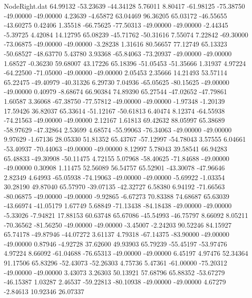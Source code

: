\begin{filecontents}{NodeRight.dat}
  64.99132  -53.23639  -44.34128     5.76011    8.80417  -61.98125  -75.38750  -49.00000  -49.00000    4.23639   -4.65872   63.04469   96.36205
  65.03172  -46.55655  -43.60275     0.42406    1.35518  -66.75625  -77.50313  -49.00000  -49.00000   -2.44345   -5.39725    4.42084   14.12795
  65.08239  -45.71762  -50.31616     7.55074    7.22842  -69.30000  -73.06875  -49.00000  -49.00000   -3.28238    1.31616   80.56657   77.12749
  65.13323  -50.68527  -48.63770     5.43780    3.93368  -65.84063  -73.20937  -49.00000  -49.00000    1.68527   -0.36230   59.68007   43.17226
  65.18396  -51.05453  -51.35666     1.31937    4.97224  -64.22500  -71.05000  -49.00000  -49.00000    2.05453    2.35666   14.21493   53.57114
  65.22475  -49.40979  -40.31326     6.29730    7.04936  -65.05625  -80.15625  -49.00000  -49.00000    0.40979   -8.68674   66.90384   74.89390
  65.27544  -47.02652  -47.79861     1.60587    3.36068  -67.38750  -77.57812  -49.00000  -49.00000   -1.97348   -1.20139   17.59426   36.82037
  65.33614  -51.12167  -50.61813     6.40474    8.12374  -64.55938  -74.21563  -49.00000  -49.00000    2.12167    1.61813   69.42632   88.05997
  65.38689  -58.97629  -47.32864     2.53699    4.68574  -55.99063  -76.34063  -49.00000  -49.00000    9.97629   -1.67136   28.05330   51.81352
  65.43767  -57.12997  -54.78043     3.57555    6.04661  -53.40937  -70.44063  -49.00000  -49.00000    8.12997    5.78043   39.58541   66.94283
  65.48833  -49.30908  -50.11475     4.72155    5.07968  -58.40625  -71.84688  -49.00000  -49.00000    0.30908    1.11475   52.56089   56.54757
  65.52901  -43.30078  -47.96646     2.82349    4.64993  -65.05938  -74.19063  -49.00000  -49.00000   -5.69922   -1.03354   30.28190   49.87040
  65.57970  -39.07135  -42.32727     6.58380    6.94192  -71.66563  -80.06875  -49.00000  -49.00000   -9.92865   -6.67273   70.83388   74.68687
  65.63039  -43.66974  -41.05179     1.67749    5.68849  -71.13438  -84.18438  -49.00000  -49.00000   -5.33026   -7.94821   17.88153   60.63748
  65.67086  -45.54993  -46.75797     8.66092    8.05211  -70.36562  -81.56250  -49.00000  -49.00000   -3.45007   -2.24203   90.52246   84.15927
  65.74178  -49.87946  -44.07272     3.61137    4.79318  -67.14375  -83.90000  -49.00000  -49.00000    0.87946   -4.92728   37.62600   49.93903
  65.79239  -55.45197  -53.97476     4.97224    8.66092  -61.04688  -76.65313  -49.00000  -49.00000    6.45197    4.97476   52.34364   91.17506
  65.83296  -52.43073  -52.26303     4.75736    5.47361  -61.00000  -75.20312  -49.00000  -49.00000    3.43073    3.26303   50.13921   57.68796
  65.88352  -53.67279  -46.15387     1.03287    2.46537  -59.22813  -80.10938  -49.00000  -49.00000    4.67279   -2.84613   10.92346   26.07337

\end{filecontents}
